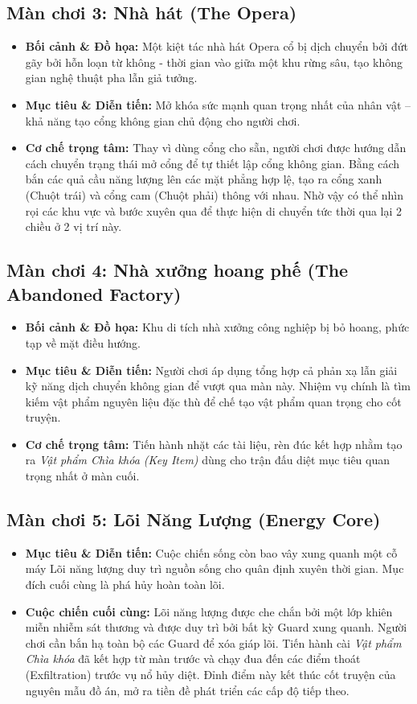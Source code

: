 \documentclass[../DoAn.tex]{subfiles}
\begin{document}
\subsection{Màn chơi 3: Nhà hát (The Opera)}
\begin{itemize}
    \item \textbf{Bối cảnh \& Đồ họa:} Một kiệt tác nhà hát Opera cổ bị dịch chuyển bởi đứt gãy bởi hỗn loạn từ không - thời gian vào giữa một khu rừng sâu, tạo không gian nghệ thuật pha lẫn giả tưởng.
    \item \textbf{Mục tiêu \& Diễn tiến:} Mở khóa sức mạnh quan trọng nhất của nhân vật -- khả năng tạo cổng không gian chủ động cho người chơi. 
    \item \textbf{Cơ chế trọng tâm:} Thay vì dùng cổng cho sẵn, người chơi được hướng dẫn cách chuyển trạng thái mở cổng để tự thiết lập cổng không gian. Bằng cách bắn các quả cầu năng lượng lên các mặt phẳng hợp lệ, tạo ra cổng xanh (Chuột trái) và cổng cam (Chuột phải) thông với nhau. Nhờ vậy có thể nhìn rọi các khu vực và bước xuyên qua để thực hiện di chuyển tức thời qua lại 2 chiều ở 2 vị trí này.
\end{itemize}

\subsection{Màn chơi 4: Nhà xưởng hoang phế (The Abandoned Factory)}
\begin{itemize}
    \item \textbf{Bối cảnh \& Đồ họa:} Khu di tích nhà xưởng công nghiệp bị bỏ hoang, phức tạp về mặt điều hướng.
    \item \textbf{Mục tiêu \& Diễn tiến:} Người chơi áp dụng tổng hợp cả phản xạ lẫn giải kỹ năng dịch chuyển không gian để vượt qua màn này. Nhiệm vụ chính là tìm kiếm vật phẩm nguyên liệu đặc thù để chế tạo vật phẩm quan trọng cho cốt truyện.
    \item \textbf{Cơ chế trọng tâm:} Tiến hành nhặt các tài liệu, rèn đúc kết hợp nhằm tạo ra \textit{Vật phẩm Chìa khóa (Key Item)} dùng cho trận đấu diệt mục tiêu quan trọng nhất ở màn cuối.
\end{itemize}

\subsection{Màn chơi 5: Lõi Năng Lượng (Energy Core)}
\begin{itemize}
    \item \textbf{Mục tiêu \& Diễn tiến:} Cuộc chiến sống còn bao vây xung quanh một cỗ máy Lõi năng lượng duy trì nguồn sống cho quân định xuyên thời gian. Mục đích cuối cùng là phá hủy hoàn toàn lõi.
    \item \textbf{Cuộc chiến cuối cùng:} Lõi năng lượng được che chắn bởi một lớp khiên miễn nhiễm sát thương và được duy trì bởi bất kỳ Guard xung quanh. Người chơi cần bắn hạ toàn bộ các Guard để xóa giáp lõi. Tiến hành cài \textit{Vật phẩm Chìa khóa} đã kết hợp từ màn trước và chạy đua đến các điểm thoát (Exfiltration) trước vụ nổ hủy diệt. Đỉnh điểm này kết thúc cốt truyện của nguyên mẫu đồ án, mở ra tiền đề phát triển các cấp độ tiếp theo.
\end{itemize}
\end{document}

